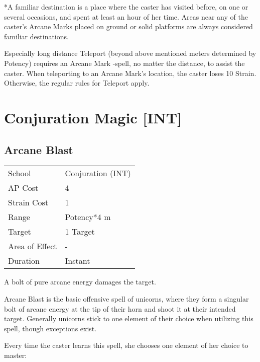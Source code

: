 \documentclass[11pt,a4paper,twocolumn]{book}
\begin{document}
\medskip

*A familiar destination is a place where the caster has visited before, on one or several occasions, and spent at least an hour of her time. Areas near any of the caster's Arcane Marks placed on ground or solid platforms are always considered familiar destinations.

Especially long distance Teleport (beyond above mentioned meters determined by Potency) requires an Arcane Mark -spell, no matter the distance, to assist the caster. When teleporting to an Arcane Mark's location, the caster loses 10 Strain. Otherwise, the regular rules for Teleport apply.

\vfill

\section*{Conjuration Magic [INT]}

\subsection*{Arcane Blast}
{
	\begin{tabu} to 75mm{| X[l,4] | X[l,7] |}
		\hline
		School 			& Conjuration (INT) \\
		AP Cost	      	& 4 				\\
		Strain Cost     & 1 				\\
		Range     		& Potency*4 m 		\\
		Target      	& 1 Target 			\\
		Area of Effect  & - 	 			\\
		Duration     	& Instant 			\\ \hline
	\end{tabu}
	
}

\medskip

A bolt of pure arcane energy damages the target.

Arcane Blast is the basic offensive spell of unicorns, where they form a singular bolt of arcane energy at the tip of their horn and shoot it at their intended target. Generally unicorns stick to one element of their choice when utilizing this spell, though exceptions exist.

Every time the caster learns this spell, she chooses one element of her choice to master:
\end{document}
